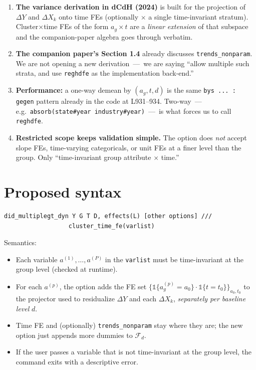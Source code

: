 \documentclass[11pt]{article}
\newcommand{\code}[1]{\texttt{\small #1}}
\newcommand{\1}{\mathbb{1}}
\begin{document}
\begin{enumerate}[leftmargin=*, itemsep=2pt]
\item \textbf{The variance derivation in dCdH (2024)} is built for the
projection of $\Delta Y$ and $\Delta X_k$ onto time FEs (optionally
$\times$ a single time-invariant stratum). Cluster$\times$time FEs of the
form $a_g\times t$ are a \emph{linear extension} of that subspace and the
companion-paper algebra goes through verbatim.
\item \textbf{The companion paper's Section 1.4} already discusses
\texttt{trends\_nonparam}. We are not opening a new derivation \,---\,
we are saying ``allow multiple such strata, and use \texttt{reghdfe} as the
implementation back-end.''
\item \textbf{Performance:} a one-way demean by $(a_g, t, d)$ is the same
\code{bys ... : gegen} pattern already in the code at L931--934. Two-way
\,---\, e.g.\ \code{absorb(state\#year industry\#year)} \,---\, is what
forces us to call \texttt{reghdfe}.
\item \textbf{Restricted scope keeps validation simple.} The option does
\emph{not} accept slope FEs, time-varying categoricals, or unit FEs at a
finer level than the group. Only ``time-invariant group attribute $\times$
time.''
\end{enumerate}

\section{Proposed syntax}

\begin{lstlisting}
did_multiplegt_dyn Y G T D, effects(L) [other options] ///
                  cluster_time_fe(varlist)
\end{lstlisting}

\noindent
Semantics:
\begin{itemize}[leftmargin=*, itemsep=2pt]
\item Each variable $a^{(1)}, \dots, a^{(P)}$ in the \code{varlist} must be
      time-invariant at the group level (checked at runtime).
\item For each $a^{(p)}$, the option adds the FE set
      $\{\1\{a^{(p)}_g = a_0\}\cdot \1\{t = t_0\}\}_{a_0, t_0}$ to the
      projector used to residualize $\Delta Y$ and each $\Delta X_k$,
      \emph{separately per baseline level} $d$.
\item Time FE and (optionally) \code{trends\_nonparam} stay where they are;
      the new option just appends more dummies to $\mathcal{F}_d$.
\item If the user passes a variable that is not time-invariant at the group
      level, the command exits with a descriptive error.
\end{itemize}
\end{document}
